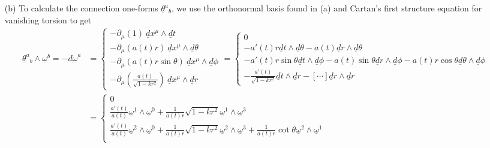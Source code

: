 \documentclass[10pt, a4paper]{article}
\begin{document}
{\begin{enumerate}
\begin{align*}
     &= \underline{\omega}^0 \underline{\omega}^0 - \underline{\omega}^1 \underline{\omega}^1 - \underline{\omega}^2 \underline{\omega}^2 - \underline{\omega}^3 \underline{\omega}^3 
  \end{align*}
  where $\{\underline{\omega}^a\}_{a=0}^{3} = \{\underline{d} t, \ a(t) r\underline{d} \theta, \ a(t) r\sin \theta \underline{d} \phi, \ \frac{a(t)}{\sqrt{1-k r^2}} \underline{d} r\}$ is shown to satisfy the orthonormality condition. We note that the resulting choice of basis is unique up to a local Lorentz transformation (which preserves orthonormality). 
  \item[(b)] To calculate the connection one-forms $\underline{\theta}^a{}_b$, we use the orthonormal basis found in (a) and Cartan's first structure equation for vanishing torsion to get 
  \begin{align*}
    \underline{\theta}^a{ }_b \wedge \underline{\omega}^b = -\underline{d \omega}^a &= 
    \begin{cases}
     -\partial_{\mu}(1)\ \underline{d} x^\mu \wedge \underline{d} t\\
     -\partial_{\mu}(a(t) r)\ \underline{d} x^\mu \wedge \underline{d} \theta\\
     -\partial_{\mu}(a(t) r\sin \theta)\ \underline{d} x^\mu \wedge \underline{d} \phi\\
     -\partial_{\mu}\left(\frac{a(t)}{\sqrt{1-k r^2}}\right)\ \underline{d} x^\mu \wedge \underline{d} r
    \end{cases}=
    \begin{cases}
      0\\
     -a'(t) r\underline{d} t \wedge \underline{d} \theta - a(t)\underline{d} r \wedge \underline{d} \theta\\
     -a'(t) r\sin \theta \underline{d}t \wedge \underline{d} \phi -  a(t) \sin \theta \underline{d}r \wedge \underline{d} \phi - a(t) r\cos \theta \underline{d}\theta \wedge \underline{d} \phi\\
     -\frac{a'(t)}{\sqrt{1-k r^2}}\underline{d} t \wedge \underline{d} r - [\cdots]\underline{d} r \wedge \underline{d} r 
    \end{cases}
    \\
    &=
    \begin{cases}
      0\\
     \frac{a'(t)}{a(t)} \underline{\omega}^1 \wedge \underline{\omega}^0 + \frac{1}{a(t)r}\sqrt{1-k r^2}\underline{\omega}^1 \wedge \underline{\omega}^3\\
     \frac{a'(t)}{a(t)} \underline{\omega}^2 \wedge \underline{\omega}^0 +  \frac{1}{a(t)r}\sqrt{1-k r^2} \underline{\omega}^2 \wedge \underline{\omega}^3 + \frac{1}{a(t)r}\cot \theta \underline{\omega}^2 \wedge \underline{ \omega}^1\\

\end{cases}
\end{align*}
\end{enumerate}}
\end{document}

